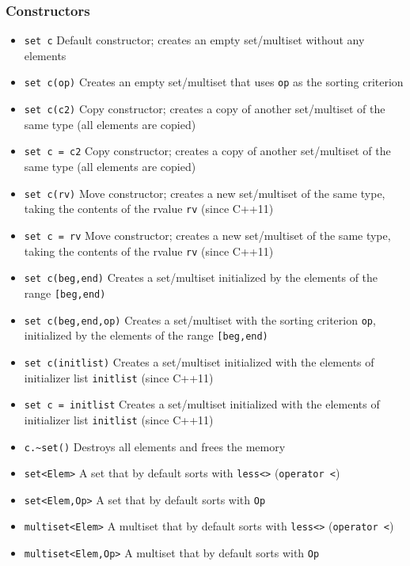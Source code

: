 \documentclass{report}
\begin{document}
\subsubsection{Constructors}
\begin{itemize}
    \item \texttt{set c} Default constructor; creates an empty set/multiset without any elements
    \item \texttt{set c(op)} Creates an empty set/multiset that uses \texttt{op} as the sorting criterion
    \item \texttt{set c(c2)} Copy constructor; creates a copy of another set/multiset of the same type (all elements are copied)
    \item \texttt{set c = c2} Copy constructor; creates a copy of another set/multiset of the same type (all elements are copied)
    \item \texttt{set c(rv)} Move constructor; creates a new set/multiset of the same type, taking the contents of the rvalue \texttt{rv} (since C++11)
    \item \texttt{set c = rv} Move constructor; creates a new set/multiset of the same type, taking the contents of the rvalue \texttt{rv} (since C++11)
    \item \texttt{set c(beg,end)} Creates a set/multiset initialized by the elements of the range \texttt{[beg,end)}
    \item \texttt{set c(beg,end,op)} Creates a set/multiset with the sorting criterion \texttt{op}, initialized by the elements of the range \texttt{[beg,end)}
    \item \texttt{set c(initlist)} Creates a set/multiset initialized with the elements of initializer list \texttt{initlist} (since C++11)
    \item \texttt{set c = initlist} Creates a set/multiset initialized with the elements of initializer list \texttt{initlist} (since C++11)
    \item \texttt{c.\~{}set()} Destroys all elements and frees the memory
\end{itemize}
\bigbreak \noindent 
\begin{itemize}
    \item \texttt{set<Elem>} A set that by default sorts with \texttt{less<>} (\texttt{operator <})
    \item \texttt{set<Elem,Op>} A set that by default sorts with \texttt{Op}
    \item \texttt{multiset<Elem>} A multiset that by default sorts with \texttt{less<>} (\texttt{operator <})
    \item \texttt{multiset<Elem,Op>} A multiset that by default sorts with \texttt{Op}
\end{itemize}
\end{document}
